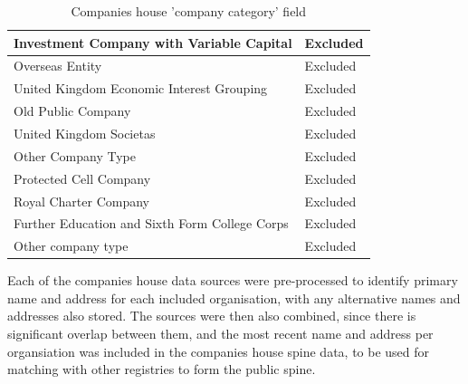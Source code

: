 \documentclass{article}
\begin{document}
\begin{table}[h]
\begin{tabularx}{\textwidth}{|X|l|}
    Investment Company with Variable Capital & Excluded \\ \hline
    Overseas Entity & Excluded \\ \hline
    United Kingdom Economic Interest Grouping & Excluded \\ \hline
    Old Public Company & Excluded \\ \hline
    United Kingdom Societas & Excluded \\ \hline
    Other Company Type & Excluded \\ \hline
    Protected Cell Company & Excluded \\ \hline
    Royal Charter Company & Excluded \\ \hline
    Further Education and Sixth Form College Corps & Excluded \\ \hline
    Other company type & Excluded \\ \hline
    \hline

\end{tabularx}
\caption{Companies house 'company category' field}
\label{tab:CH_companytypes}
\end{table}

Each of the  companies house data sources were pre-processed to identify primary name and address for each 
included organisation, with any alternative names and addresses also stored. The sources were then 
also combined, since there is significant overlap between them, and the most recent name and address
per organsiation was included in the companies house spine data, to be used for matching with other 
registries to form the public spine.

%
%


%
\end{document}

